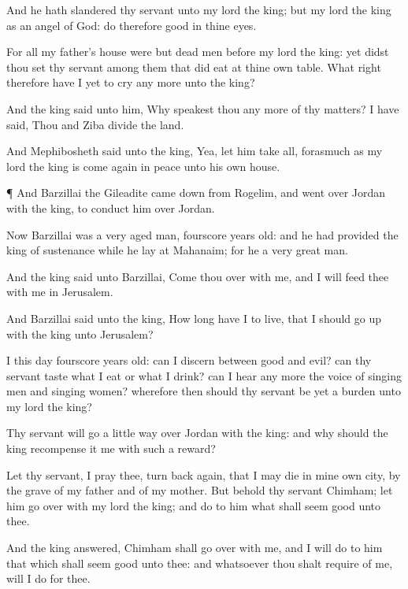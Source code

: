 {And he hath
slandered thy
servant unto my
lord the
king; but my
lord the
king
{} as an
angel of
God:
do therefore
{}
good in thine
eyes.

For all
{} my
father’s
house were
but
dead
men before my
lord the
king: yet didst thou
set thy
servant among them that did
eat at thine own
table. What
right therefore
have I yet to
cry any more unto the
king?

And the
king
said unto him, Why
speakest thou any more of thy
matters? I have
said, Thou and
Ziba
divide the
land.

And
Mephibosheth
said unto the
king, Yea, let him
take all,
forasmuch
as my
lord the
king is come
again in
peace unto his own
house.


\par }{\PP {}¶ And
Barzillai the
Gileadite came
down from
Rogelim, and went
over
Jordan with the
king, to
conduct him over
Jordan.

Now
Barzillai was a
very
aged man,
{}
fourscore
years
old: and he had provided the
king of
sustenance while he
lay at
Mahanaim; for he
{} a
very
great
man.

And the
king
said unto
Barzillai, Come thou
over with me, and I will
feed thee with me in
Jerusalem.

And
Barzillai
said unto the
king, How
long have I to
live, that I should go
up with the
king unto
Jerusalem?

I
{} this
day
fourscore
years
old:
{} can I
discern between
good and
evil? can thy
servant
taste
what I
eat or
what I
drink? can I
hear any more the
voice of singing
men and singing
women? wherefore then should thy
servant be yet a
burden unto my
lord the
king?

Thy
servant will
go a little
way
over
Jordan with the
king: and why should the
king
recompense it me with such a
reward?

Let thy
servant, I pray thee, turn back
again, that I may
die in mine own
city,
{} by the
grave of my
father and of my
mother. But behold thy
servant
Chimham; let him go
over with my
lord the
king; and
do to him what shall seem
good unto thee.

And the
king
answered,
Chimham shall
go over with me, and I will
do to him that which shall seem
good unto thee: and whatsoever thou shalt
require of me,
{} will I
do for thee.

}
